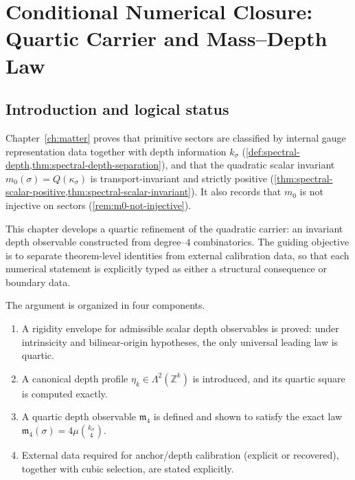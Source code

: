 \chapter{Conditional Numerical Closure: Quartic Carrier and Mass--Depth Law}
\label{ch:matter-numbers}

\section{Introduction and logical status}
\label{sec:numbers-intro}

Chapter~\ref{ch:matter} proves that primitive sectors are classified by
internal gauge representation data together with depth information
\(k_\sigma\) (\cref{def:spectral-depth,thm:spectral-depth-separation}),
and that the quadratic scalar invariant
\(m_0(\sigma)=Q(\kappa_\sigma)\) is transport-invariant and strictly
positive (\cref{thm:spectral-scalar-positive,thm:spectral-scalar-invariant}).
It also records that \(m_0\) is not injective on sectors
(\cref{rem:m0-not-injective}).

This chapter develops a quartic refinement of the quadratic carrier:
an invariant depth observable constructed from degree--\(4\) combinatorics.
The guiding objective is to separate theorem-level identities from
external calibration data, so that each numerical statement is
explicitly typed as either a structural consequence or boundary data.

The argument is organized in four components.
\begin{enumerate}[label=\textup{(\roman*)}]
\item A rigidity envelope for admissible scalar depth observables is proved:
      under intrinsicity and bilinear-origin hypotheses, the only universal
      leading law is quartic.
\item A canonical depth profile \(\eta_k\in\Lambda^2(\mathbb Z^k)\) is
      introduced, and its quartic square is computed exactly.
\item A quartic depth observable \(\mathfrak m_4\) is defined and shown to
      satisfy the exact law
      \(\mathfrak m_4(\sigma)=4\mu\binom{k_\sigma}{4}\).
\item External data required for anchor/depth calibration (explicit or
      recovered), together with cubic selection,
      are stated explicitly.
\end{enumerate}

